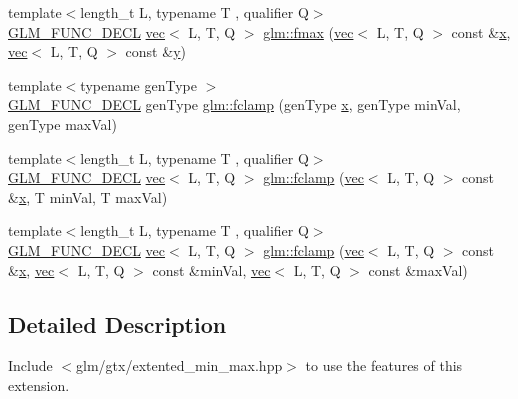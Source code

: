 \begin{DoxyCompactItemize}
\item 
{\footnotesize template$<$length\+\_\+t L, typename T , qualifier Q$>$ }\\\hyperlink{setup_8hpp_ab2d052de21a70539923e9bcbf6e83a51}{G\+L\+M\+\_\+\+F\+U\+N\+C\+\_\+\+D\+E\+CL} \hyperlink{structglm_1_1vec}{vec}$<$ L, T, Q $>$ \hyperlink{group__gtx__extended__min__max_ga538c9e7de1d0cb8157e548691487d32a}{glm\+::fmax} (\hyperlink{structglm_1_1vec}{vec}$<$ L, T, Q $>$ const \&\hyperlink{_s_d_l__opengl_8h_ad0e63d0edcdbd3d79554076bf309fd47}{x}, \hyperlink{structglm_1_1vec}{vec}$<$ L, T, Q $>$ const \&\hyperlink{_s_d_l__opengl_8h_a1675d9d7bb68e1657ff028643b4037e3}{y})
\item 
{\footnotesize template$<$typename gen\+Type $>$ }\\\hyperlink{setup_8hpp_ab2d052de21a70539923e9bcbf6e83a51}{G\+L\+M\+\_\+\+F\+U\+N\+C\+\_\+\+D\+E\+CL} gen\+Type \hyperlink{group__gtx__extended__min__max_ga1e28539d3a46965ed9ef92ec7cb3b18a}{glm\+::fclamp} (gen\+Type \hyperlink{_s_d_l__opengl_8h_ad0e63d0edcdbd3d79554076bf309fd47}{x}, gen\+Type min\+Val, gen\+Type max\+Val)
\item 
{\footnotesize template$<$length\+\_\+t L, typename T , qualifier Q$>$ }\\\hyperlink{setup_8hpp_ab2d052de21a70539923e9bcbf6e83a51}{G\+L\+M\+\_\+\+F\+U\+N\+C\+\_\+\+D\+E\+CL} \hyperlink{structglm_1_1vec}{vec}$<$ L, T, Q $>$ \hyperlink{group__gtx__extended__min__max_ga60796d08903489ee185373593bc16b9d}{glm\+::fclamp} (\hyperlink{structglm_1_1vec}{vec}$<$ L, T, Q $>$ const \&\hyperlink{_s_d_l__opengl_8h_ad0e63d0edcdbd3d79554076bf309fd47}{x}, T min\+Val, T max\+Val)
\item 
{\footnotesize template$<$length\+\_\+t L, typename T , qualifier Q$>$ }\\\hyperlink{setup_8hpp_ab2d052de21a70539923e9bcbf6e83a51}{G\+L\+M\+\_\+\+F\+U\+N\+C\+\_\+\+D\+E\+CL} \hyperlink{structglm_1_1vec}{vec}$<$ L, T, Q $>$ \hyperlink{group__gtx__extended__min__max_ga5c15fa4709763c269c86c0b8b3aa2297}{glm\+::fclamp} (\hyperlink{structglm_1_1vec}{vec}$<$ L, T, Q $>$ const \&\hyperlink{_s_d_l__opengl_8h_ad0e63d0edcdbd3d79554076bf309fd47}{x}, \hyperlink{structglm_1_1vec}{vec}$<$ L, T, Q $>$ const \&min\+Val, \hyperlink{structglm_1_1vec}{vec}$<$ L, T, Q $>$ const \&max\+Val)
\end{DoxyCompactItemize}


\subsection{Detailed Description}
Include $<$glm/gtx/extented\+\_\+min\+\_\+max.\+hpp$>$ to use the features of this extension.

